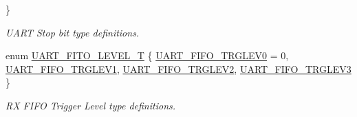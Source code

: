 \begin{DoxyCompactItemize}
 \}
\begin{DoxyCompactList}\small\item\em U\-A\-R\-T Stop bit type definitions. \end{DoxyCompactList}\item 
enum \hyperlink{class_c_serial_a767bb157f0f469eb5bf5c99b8ada42f1}{U\-A\-R\-T\-\_\-\-F\-I\-T\-O\-\_\-\-L\-E\-V\-E\-L\-\_\-\-T} \{ \hyperlink{class_c_serial_a767bb157f0f469eb5bf5c99b8ada42f1aec8c4b69719ee6b1dc43cf6ccdd999de}{U\-A\-R\-T\-\_\-\-F\-I\-F\-O\-\_\-\-T\-R\-G\-L\-E\-V0} = 0, 
\hyperlink{class_c_serial_a767bb157f0f469eb5bf5c99b8ada42f1a2d29eb800e28d845f00b9fd5df1b955c}{U\-A\-R\-T\-\_\-\-F\-I\-F\-O\-\_\-\-T\-R\-G\-L\-E\-V1}, 
\hyperlink{class_c_serial_a767bb157f0f469eb5bf5c99b8ada42f1a3ca31e41f3d74e387b0ff625a927bcf4}{U\-A\-R\-T\-\_\-\-F\-I\-F\-O\-\_\-\-T\-R\-G\-L\-E\-V2}, 
\hyperlink{class_c_serial_a767bb157f0f469eb5bf5c99b8ada42f1a6893ab299c8d6be2e17efb39cd05e1a1}{U\-A\-R\-T\-\_\-\-F\-I\-F\-O\-\_\-\-T\-R\-G\-L\-E\-V3}
 \}
\begin{DoxyCompactList}\small\item\em R\-X F\-I\-F\-O Trigger Level type definitions. \end{DoxyCompactList}\end{DoxyCompactItemize}
